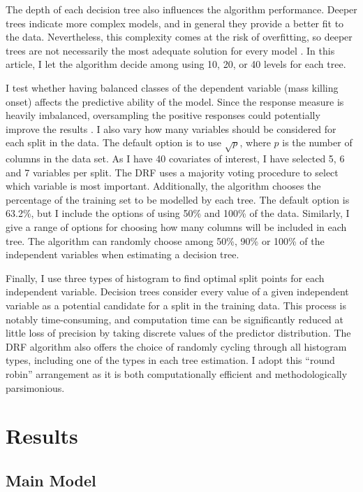 The depth of each decision tree also influences the algorithm performance. Deeper trees indicate more complex models, and in general they provide a better fit to the data. Nevertheless, this complexity comes at the risk of overfitting, so deeper trees are not necessarily the most adequate solution for every model \citep[596]{friedman2001greedy,segal2004machine}. In this article, I let the algorithm decide among using 10, 20, or 40 levels for each tree. 
	
I test whether having balanced classes of the dependent variable (mass killing onset) affects the predictive ability of the model. Since the response measure is heavily imbalanced, oversampling the positive responses could potentially improve the results \citep{chawla2004special,del2014use,japkowicz2002class}. 
I also vary how many variables should be considered for each split in the data. The default option is to use $\sqrt{p}$, where $p$ is the number of columns in the data set. As I have 40 covariates of interest, I have selected 5, 6 and 7 variables per split. The DRF uses a majority voting procedure to select which variable is most important. Additionally, the algorithm chooses the percentage of the training set to be modelled by each tree. The default option is 63.2\%, but I include the options of using 50\% and 100\% of the data. Similarly, I give a range of options for choosing how many columns will be included in each tree. The algorithm can randomly choose among 50\%, 90\% or 100\% of the independent variables when estimating a decision tree.

Finally, I use three types of histogram to find optimal split points for each independent variable. Decision trees consider every value of a given independent variable as a potential candidate for a split in the training data. This process is notably time-consuming, and computation time can be significantly reduced at little loss of precision by taking discrete values of the predictor distribution. The DRF algorithm also offers the choice of randomly cycling through all histogram types, including one of the types in each tree estimation. I adopt this ``round robin'' arrangement as it is both computationally efficient and methodologically parsimonious.
	
\section{Results}
\label{sec:results4}

\subsection{Main Model}%
\label{sub:main_model}
	
